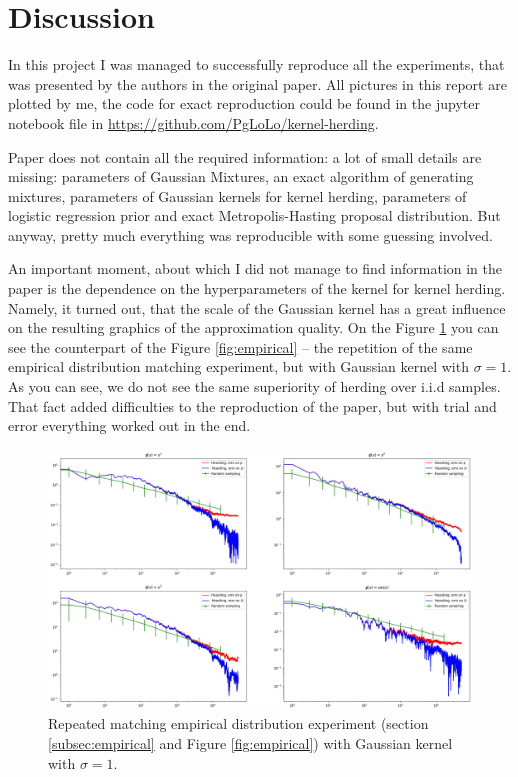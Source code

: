 \documentclass[tablecaption=bottom,wcp]{jmlr} %
\begin{document}
\section{Discussion} \label{sec:discussion}
    In this project I was managed to successfully reproduce all the experiments, that was presented by the authors in the original paper. All pictures in this report are plotted by me, the code for exact reproduction could be found in the jupyter notebook file in \href{https://github.com/PgLoLo/kernel-herding}{https://github.com/PgLoLo/kernel-herding}.

    Paper does not contain all the required information: a lot of small details are missing: parameters of Gaussian Mixtures, an exact algorithm of generating mixtures, parameters of Gaussian kernels for kernel herding, parameters of logistic regression prior and exact Metropolis-Hasting proposal distribution. But anyway, pretty much everything was reproducible with some guessing involved.

    An important moment, about which I did not manage to find information in the paper is the dependence on the hyperparameters of the kernel for kernel herding. Namely, it turned out, that the scale of the Gaussian kernel has a great influence on the resulting graphics of the approximation quality. On the Figure \ref{fig:counterpart} you can see the counterpart of the Figure \ref{fig:empirical} -- the repetition of the same empirical distribution matching experiment, but with Gaussian kernel with $\sigma = 1$. As you can see, we do not see the same superiority of herding over i.i.d samples. That fact added difficulties to the reproduction of the paper, but with trial and error everything worked out in the end.

    \begin{figure}
        \includegraphics[width=.8\textwidth]{images/counterpart}
        \caption{Repeated matching empirical distribution experiment (section \ref{subsec:empirical} and Figure \ref{fig:empirical}) with Gaussian kernel with $\sigma = 1$.}
        \label{fig:counterpart}
    \end{figure}



\end{document}
